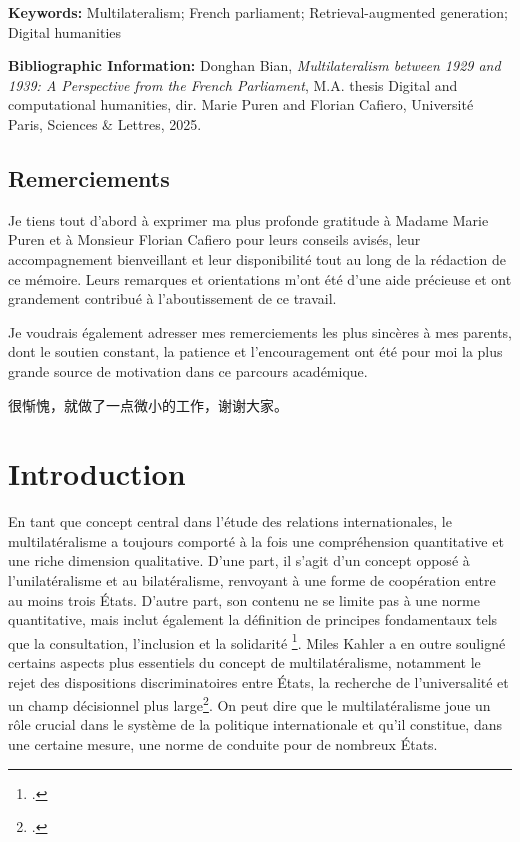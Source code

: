 \documentclass[a4paper,twoside,12pt]{book}
\begin{document}
\textbf{Keywords:} Multilateralism; French parliament; Retrieval-augmented generation; Digital humanities

\textbf{Bibliographic Information:} Donghan Bian, \textit{Multilateralism between 1929 and 1939: A Perspective from the French Parliament}, M.A. thesis \og Digital and computational humanities\fg{}, dir. Marie Puren  and Florian Cafiero, Université Paris, Sciences \& Lettres, 2025.

\clearpage


\thispagestyle{empty}
\cleardoublepage


\section*{Remerciements}

Je tiens tout d'abord à exprimer ma plus profonde gratitude à Madame Marie Puren et à Monsieur Florian Cafiero pour leurs conseils avisés, leur accompagnement bienveillant et leur disponibilité tout au long de la rédaction de ce mémoire. Leurs remarques et orientations m'ont été d'une aide précieuse et ont grandement contribué à l'aboutissement de ce travail.

\bigskip

Je voudrais également adresser mes remerciements les plus sincères à mes parents, dont le soutien constant, la patience et l'encouragement ont été pour moi la plus grande source de motivation dans ce parcours académique.

\bigskip

很惭愧，就做了一点微小的工作，谢谢大家。

\clearpage


\thispagestyle{empty}
\cleardoublepage



\clearpage
\thispagestyle{empty}
\cleardoublepage


\mainmatter


\chapter{Introduction}

En tant que concept central dans l'étude des relations internationales, le multilatéralisme a toujours comporté à la fois une compréhension quantitative et une riche dimension qualitative. D'une part, il s'agit d'un concept opposé à l'unilatéralisme et au bilatéralisme, renvoyant à une forme de coopération entre au moins trois États. D'autre part, son contenu ne se limite pas à une norme quantitative, mais inclut également la définition de principes fondamentaux tels que la consultation, l'inclusion et la solidarité \footcite{nationsb}. Miles Kahler a en outre souligné certains aspects plus essentiels du concept de multilatéralisme, notamment le rejet des dispositions discriminatoires entre États, la recherche de l'universalité et un champ décisionnel plus large\footcite{kahler1992}. On peut dire que le multilatéralisme joue un rôle crucial dans le système de la politique internationale et qu'il constitue, dans une certaine mesure, une norme de conduite pour de nombreux États.
\end{document}
